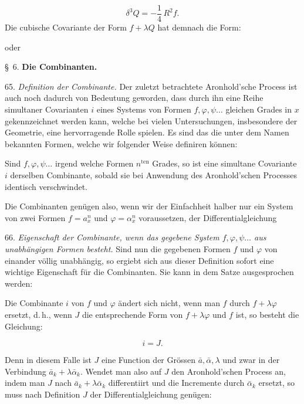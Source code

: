 \[
\delta^3 Q = -\frac{1}{4}\,R^2 f .
\]
Die cubische Covariante der Form $f + \lambda Q$ hat demnach die Form:

oder


\begin{center}
\S\ 6. \textbf{Die Combinanten.}
\end{center}

65. \textit{Definition der Combinante.} Der zuletzt betrachtete Aronhold'sche Process ist auch noch dadurch von Bedeutung geworden, dass durch ihn eine Reihe simultaner Covarianten $i$ eines Systems von Formen $f, \varphi, \psi \ldots$ gleichen Grades in $x$ gekennzeichnet werden kann, welche bei vielen Untersuchungen, insbesondere der Geometrie, eine hervorragende Rolle spielen. Es sind das die unter dem Namen  bekannten Formen, welche wir folgender Weise definiren können:

\glqq{}Sind $f, \varphi, \psi \ldots$ irgend welche Formen $n^{\text{ten}}$ Grades, so ist eine simultane Covariante $i$ derselben Combinante, sobald sie bei Anwendung des Aronhold'schen Processes identisch verschwindet.\grqq{}

Die Combinanten genügen also, wenn wir der Einfachheit halber nur ein System von zwei Formen $f = a_x^n$ und $\varphi = \alpha_x^n$ voraussetzen, der Differentialgleichung

66. \textit{Eigenschaft der Combinante, wenn das gegebene System $f, \varphi, \psi \ldots$ aus unabhängigen Formen besteht.} Sind nun die gegebenen Formen $f$ und $\varphi$ von einander völlig unabhängig, so ergiebt sich aus dieser Definition sofort eine wichtige Eigenschaft für die Combinanten. Sie kann in dem Satze ausgesprochen werden:

\glqq{}Die Combinante $i$ von $f$ und $\varphi$ ändert sich nicht, wenn man $f$ durch $f + \lambda \varphi$ ersetzt, d.\,h., wenn $J$ die entsprechende Form von $f + \lambda \varphi$ und $f$ ist, so besteht die Gleichung:

\[
i = J .
\]
\grqq{}


Denn in diesem Falle ist $J$ eine Function der Grössen $\bar a, \bar \alpha, \lambda$ und zwar in der Verbindung $\bar a_k + \lambda \bar \alpha_k$. Wendet man also auf $J$ den Aronhold'schen Process an, indem man $J$ nach $\bar a_k + \lambda \bar \alpha_k$ differentiirt und die Incremente durch $\bar \alpha_k$ ersetzt, so muss nach Definition $J$ der Differentialgleichung genügen:

